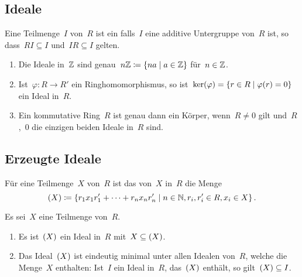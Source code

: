 \subsection{Ideale}

\begin{definition}
  Eine Teilmenge~$I$ von~$R$ ist ein  falls~$I$ eine additive Untergruppe von~$R$ ist, so dass~$RI \subseteq I$ und~$IR \subseteq I$ gelten.
\end{definition}

\begin{example}
  \leavevmode
  \begin{enumerate}
    \item
      Die Ideale in~$\mathbb{Z}$ sind genau~$n \Integer \defined \{ na \suchthat a \in \Integer \}$ für~$n \in \mathbb{Z}$.
    \item
      Ist~$\varphi \colon R \to R'$ ein Ringhomomorphismus, so ist~$\ker(\varphi) = \{ r \in R \suchthat \varphi(r) = 0 \}$ ein Ideal in~$R$.
    \item
      Ein kommutative Ring~$R$ ist genau dann ein Körper, wenn~$R \neq 0$ gilt und~$R$,~$0$ die einzigen beiden Ideale in~$R$ sind.
  \end{enumerate}
\end{example}



\subsection{Erzeugte Ideale}

\begin{definition}
  Für eine Teilmenge~$X$ von~$R$ ist das von~$X$ in~$R$  die Menge
  \[
    \genideal{X}
    \defined
    \{
      r_1 x_1 r'_1 + \dotsb + r_n x_n r'_n
    \suchthat
      n \in \Natural,
      r_i, r'_i \in R,
      x_i \in X
    \} \,.
  \]
\end{definition}

\begin{proposition}
  Es sei~$X$ eine Teilmenge von~$R$.
  \begin{enumerate}
    \item
      Es ist~$(X)$ ein Ideal in~$R$ mit~$X \subseteq (X)$.
    \item
      Das Ideal~$(X)$ ist eindeutig minimal unter allen Idealen von~$R$, welche die Menge~$X$ enthalten:
      Ist~$I$ ein Ideal in~$R$, das~$(X)$ enthält, so gilt~$(X) \subseteq I$.
  \end{enumerate}
\end{proposition}

